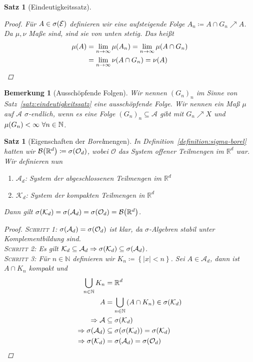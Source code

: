 \documentclass[11pt, twoside, a4paper]{article}
\theoremstyle{plain}
\newtheorem{bemerkung}[blockelement]{Bemerkung}
\newtheorem{satz}[blockelement]{Satz}
\numberwithin{equation}{subsection}
\newcommand{\set}[1]{\left\{#1\right\}}
\newcommand{\pair}[1]{\left(#1\right)}
\newcommand{\of}[1]{\mathopen{}\mathclose{}\bgroup\left(#1\aftergroup\egroup\right)}
\newcommand{\abs}[1]{\left\lvert#1\right\rvert}
\newcommand{\impl}[0]{\Rightarrow{}}
\newcommand{\toinf}{\to\infty}
\newcommand{\R}{\mathbb{R}}
\newcommand{\N}{\mathbb{N}}
\newcommand{\mA}{\mathcal{A}}
\newcommand{\mB}{\mathcal{B}}
\newcommand{\mE}{\mathcal{E}}
\newcommand{\mK}{\mathcal{K}}
\newcommand{\mO}{\mathcal{O}}
\begin{document}
\begin{satz}[Eindeutigkeitssatz]
\begin{proof}
            Für $A\in \sigma\of{\mE}$ definieren wir eine aufsteigende Folge $A_n \coloneqq A \cap G_n \nearrow A$. Da $\mu, \nu$ Maße sind, sind sie von unten stetig. Das heißt
            \begin{align*}
                \mu\of{A} &= \lim_{n\toinf} \mu\of{A_n} = \lim_{n\toinf} \mu\of{A \cap G_n}\\
                &= \lim_{n\toinf} \nu\of{A \cap G_n} = \nu\of{A}\qedhere
            \end{align*}
        \end{proof}
    \end{satz}

    \begin{bemerkung}[Ausschöpfende Folgen]
        Wir nennen $(G_n)_n$ im Sinne von Satz~\ref{satz:eindeutigkeitssatz} eine ausschöpfende Folge. Wir nennen ein Maß $\mu$ auf $\mA$ $\sigma$-endlich, wenn es eine Folge $(G_n)_n \subseteq \mA$ gibt mit $G_n \nearrow X$ und $\mu\of{G_n} < \infty~\forall n\in\N$.
    \end{bemerkung}

    \begin{satz}[Eigenschaften der \textit{Borel}mengen]
        In Definition~\ref{definition:sigma-borel} hatten wir $\mB\of{\R^d} \coloneqq \sigma\of{\mO_d}$, wobei $\mO$ das System offener Teilmengen im $\R^d$ war. Wir definieren nun
        \begin{enumerate}[label=-]
            \item $\mA_d$: System der abgeschlossenen Teilmengen im $\R^d$
            \item $\mK_d$: System der kompakten Teilmengen in $\R^d$
        \end{enumerate}
        Dann gilt $\sigma\of{\mK_d} = \sigma\of{\mA_d} = \sigma\of{\mO_d} = \mB\of{\R^d}$.
        \begin{proof}
            \textsc{Schritt 1}: $\sigma\of{\mA_d} = \sigma\of{\mO_d}$ ist klar, da $\sigma$-Algebren stabil unter Komplementbildung sind.\\
            \textsc{Schritt 2}: Es gilt $\mK_d \subseteq \mA_d \impl \sigma\of{\mK_d} \subseteq \sigma\of{\mA_d}$.\\
            \textsc{Schritt 3}: Für $n\in\N$ definieren wir $K_n \coloneqq \set{\abs{x} < n}$. Sei $A \in \mA_d$, dann ist $A\cap K_n$ kompakt und
            \begin{align*}
                \bigcup_{n\in\N} K_n &= \R^d\\
                A &= \bigcup_{n\in\N} \pair{A \cap K_n} \in \sigma\of{\mK_d}\\
                \impl \mA &\subseteq \sigma\of{\mK_d}\\
                \impl \sigma\of{\mA_d} &\subseteq \sigma\of{\sigma\of{\mK_d}} = \sigma\of{\mK_d}\\
                \impl \sigma\of{\mK_d} &= \sigma\of{\mA_d} = \sigma\of{\mO_d}\qedhere
            \end{align*}
        \end{proof}
    \end{satz}
\end{document}
